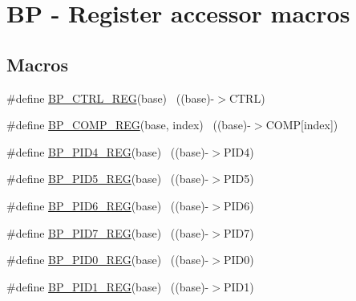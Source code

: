 \hypertarget{group___b_p___register___accessor___macros}{}\section{BP -\/ Register accessor macros}
\label{group___b_p___register___accessor___macros}
\subsection*{Macros}
\begin{DoxyCompactItemize}
\item 
\#define \hyperlink{group___b_p___register___accessor___macros_ga100429bf971494d180f9acfff3622bbc}{B\+P\+\_\+\+C\+T\+R\+L\+\_\+\+R\+EG}(base)                                            ~((base)-\/$>$C\+T\+RL)
\item 
\#define \hyperlink{group___b_p___register___accessor___macros_ga4efaa53ceb479c2ccba63e6f46db3859}{B\+P\+\_\+\+C\+O\+M\+P\+\_\+\+R\+EG}(base,  index)                                ~((base)-\/$>$C\+O\+MP\mbox{[}index\mbox{]})
\item 
\#define \hyperlink{group___b_p___register___accessor___macros_ga90e22b3ba62c6fe22d182b8e8a643b8e}{B\+P\+\_\+\+P\+I\+D4\+\_\+\+R\+EG}(base)                                            ~((base)-\/$>$P\+I\+D4)
\item 
\#define \hyperlink{group___b_p___register___accessor___macros_gaf8fb970b92294479554328432e7d385a}{B\+P\+\_\+\+P\+I\+D5\+\_\+\+R\+EG}(base)                                            ~((base)-\/$>$P\+I\+D5)
\item 
\#define \hyperlink{group___b_p___register___accessor___macros_gabb82c5c71525eef38e8f1908ff271f2c}{B\+P\+\_\+\+P\+I\+D6\+\_\+\+R\+EG}(base)                                            ~((base)-\/$>$P\+I\+D6)
\item 
\#define \hyperlink{group___b_p___register___accessor___macros_ga5482d68e251d136808a09c48adf8f7cb}{B\+P\+\_\+\+P\+I\+D7\+\_\+\+R\+EG}(base)                                            ~((base)-\/$>$P\+I\+D7)
\item 
\#define \hyperlink{group___b_p___register___accessor___macros_ga561933850ae0add931b7b8bab9becc43}{B\+P\+\_\+\+P\+I\+D0\+\_\+\+R\+EG}(base)                                            ~((base)-\/$>$P\+I\+D0)
\item 
\#define \hyperlink{group___b_p___register___accessor___macros_gab6975fbe7c4cee4a3270eedd731ad6f5}{B\+P\+\_\+\+P\+I\+D1\+\_\+\+R\+EG}(base)                                            ~((base)-\/$>$P\+I\+D1)

\end{DoxyCompactItemize}
